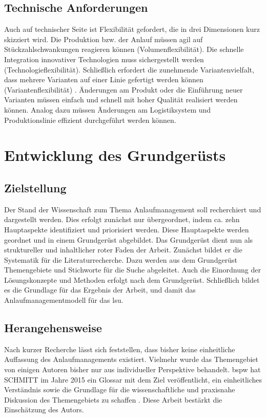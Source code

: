\subsection*{Technische Anforderungen}

Auch auf technischer Seite ist Flexibilität gefordert, die in drei Dimensionen kurz skizziert wird. 
Die Produktion bzw. der Anlauf müssen agil auf Stückzahlschwankungen reagieren können (Volumenflexibilität). Die schnelle Integration innovativer Technologien muss sichergestellt werden (Technologieflexibilität). Schließlich erfordert die zunehmende Variantenvielfalt, dass mehrere Varianten auf einer Linie gefertigt werden können (Variantenflexibilität) \cite[22]{Scholz2010}.
Änderungen am Produkt oder die Einführung neuer Varianten müssen einfach und schnell mit hoher Qualität realisiert werden können. Analog dazu müssen Änderungen am Logistiksystem und Produktionslinie effizient durchgeführt werden können.  

\section{Entwicklung des Grundgerüsts}\label{sec:grundgeruest}
\subsection*{Zielstellung}

Der Stand der Wissenschaft zum Thema Anlaufmanagement soll recherchiert und dargestellt werden. Dies erfolgt zunächst nur übergeordnet, indem ca. zehn Hauptaspekte identifiziert und priorisiert werden. Diese Hauptaspekte werden geordnet und in einem Grundgerüst abgebildet. Das Grundgerüst dient nun als struktureller und inhaltlicher roter Faden der Arbeit. 
Zunächst bildet er die Systematik für die Literaturrecherche. Dazu werden aus dem Grundgerüst Themengebiete und Stichworte für die Suche abgeleitet. 
Auch die Einordnung der Lösungskonzepte und Methoden erfolgt nach dem Grundgerüst. 
Schließlich bildet es die Grundlage für das Ergebnis der Arbeit, und damit das Anlaufmanagementmodell für das \gls{lsu}. 

\subsection*{Herangehensweise}\label{sec:herangehensweise_gg}

Nach kurzer Recherche lässt sich feststellen, dass bisher keine einheitliche Auffassung des Anlaufmanagements existiert. Vielmehr wurde das Themengebiet von einigen Autoren bisher nur aus individueller Perspektive behandelt. 
\Gls{bspw} hat SCHMITT im Jahre 2015 ein Glossar mit dem Ziel veröffentlicht, ein einheitliches Verständnis sowie die Grundlage für die wissenschaftliche und praxisnahe Diskussion des Themengebiets zu schaffen \cite{Schmitt2015}. Diese Arbeit bestärkt die Einschätzung des Autors. 

